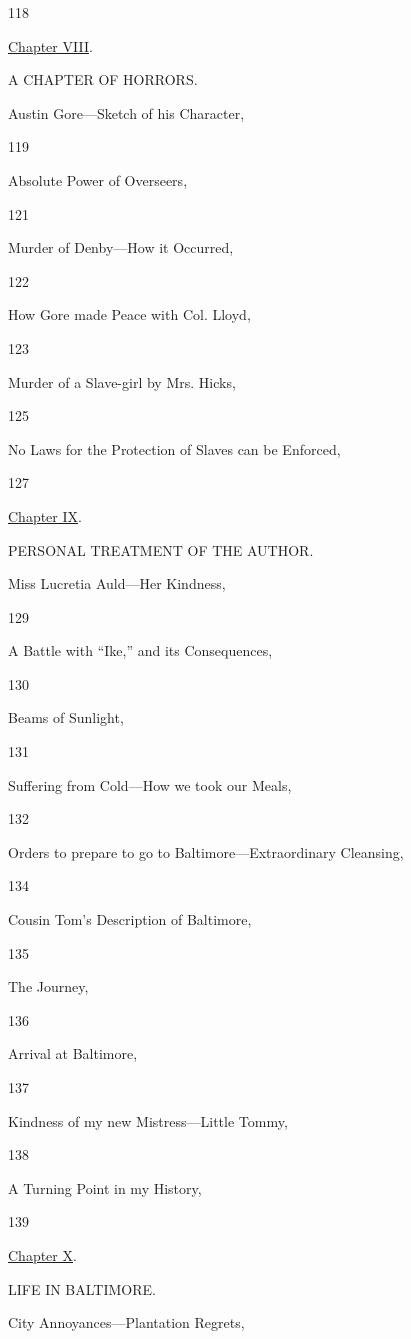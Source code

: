 118

\href{/wiki/My_Bondage_and_My_Freedom_(1855)/Chapter_VIII}{Chapter
VIII}.

A CHAPTER OF HORRORS.

Austin Gore---Sketch of his Character,

119

Absolute Power of Overseers,

121

Murder of Denby---How it Occurred,

122

How Gore made Peace with Col. Lloyd,

123

Murder of a Slave-girl by Mrs. Hicks,

125

No Laws for the Protection of Slaves can be Enforced,

127

\href{/wiki/My_Bondage_and_My_Freedom_(1855)/Chapter_IX}{Chapter IX}.

PERSONAL TREATMENT OF THE AUTHOR.

Miss Lucretia Auld---Her Kindness,

129

A Battle with ``Ike,'' and its Consequences,

130

Beams of Sunlight,

131

Suffering from Cold---How we took our Meals,

132

Orders to prepare to go to Baltimore---Extraordinary Cleansing,

134

Cousin Tom's Description of Baltimore,

135

The Journey,

136

Arrival at Baltimore,

137

Kindness of my new Mistress---Little Tommy,

138

A Turning Point in my History,

139

\href{/wiki/My_Bondage_and_My_Freedom_(1855)/Chapter_X}{Chapter X}.

LIFE IN BALTIMORE.

City Annoyances---Plantation Regrets,

